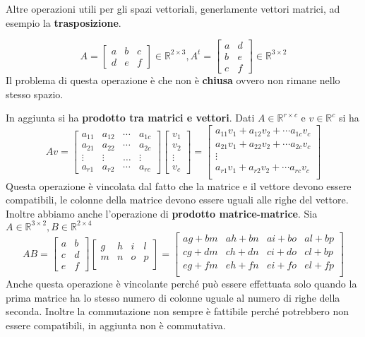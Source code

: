 Altre operazioni utili per gli spazi vettoriali, generlamente vettori matrici, ad esempio
la \textbf{trasposizione}.

$$A=\left[\begin{array}{ccc}
    a&b&c\\
    d&e&f
\end{array}\right]\in \mathbb{R}^{2\times3},  A^t = \left[\begin{array}{cc}
    a&d\\
    b&e\\
    c&f
\end{array}\right]\in \mathbb{R}^{3\times2}$$
Il problema di questa operazione è che non è \textbf{chiusa} ovvero non rimane nello
stesso spazio.

In aggiunta si ha \textbf{prodotto tra matrici e vettori}. Dati $A\in \mathbb{R}^{r\times c}$
e $v\in \mathbb{R}^{c}$ si ha
$$Av = \left[\begin{array}{cccc}
    a_{11}&a_{12}&\cdots&a_{1c}\\
    a_{21}&a_{22}&\cdots&a_{2c}\\
    \vdots&\vdots&\dots&\vdots\\
    a_{r1}& a_{r2}&\cdots& a_{rc}
\end{array}\right] \left[\begin{array}{c}
    v_1\\v_2\\\vdots\\v_c
\end{array}\right] = \left[\begin{array}{c}
    a_{11}v_1+a_{12}v_2+\cdots a_{1c}v_c\\
    a_{21}v_1+a_{22}v_2+\cdots a_{2c}v_c\\
    \vdots\\
    a_{r1}v_1+a_{r2}v_2+\cdots a_{rc}v_c\\
\end{array}\right] $$
Questa operazione è vincolata dal fatto che la matrice e il vettore devono 
essere compatibili, le colonne della matrice devono essere uguali alle righe del vettore.
Inoltre abbiamo anche l'operazione di \textbf{prodotto matrice-matrice}. Sia $A\in \mathbb{R}^{3\times 2}, B\in \mathbb{R}^{2\times 4}$
$$AB = \left[\begin{array}{cc}
    a&b\\
    c&d\\
    e&f
\end{array}\right]\left[\begin{array}{cccc}
    g&h&i&l\\
    m&n&o&p\\
\end{array}\right] = \left[\begin{array}{cccc}
    ag+bm&ah+bn&ai+bo&al+bp\\
    cg+dm&ch+dn&ci+do&cl+bp\\
    eg+fm& eh+fn&ei+fo & el+fp\\
\end{array}\right]$$
Anche questa operazione è vincolante perché può essere effettuata solo quando la prima 
matrice ha lo stesso numero di colonne uguale al numero di righe della seconda. Inoltre
la commutazione non sempre è fattibile perché potrebbero non essere compatibili, 
in aggiunta non è commutativa.